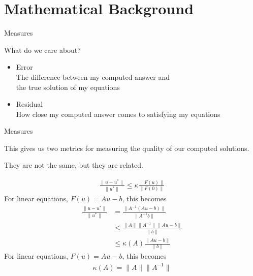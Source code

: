 \documentclass[dvipsnames]{beamer}
\begin{document}
\section{Mathematical Background}
\begin{frame}{Measures}\Large

\begin{center}\LARGE What do we care about?\end{center}

\bigskip

\begin{itemize}
  \item<2-> Error\\
    The difference between my computed answer and\\
    the true solution of my equations %

  \bigskip

  \item<3-> Residual\\
    How close my computed answer comes to satisfying my equations
\end{itemize}
\end{frame}
%
\begin{frame}{Measures}\Large
\begin{center}\LARGE This gives us two metrics for measuring the quality of our computed solutions.\end{center}

\bigskip

\begin{overprint}
\begin{center}They are not the same, but they are related.\end{center}
\begin{align*}
  \frac{\|u - u^*\|}{\|u^*\|} \le \kappa \frac{\|F(u)\|}{\|F(0)\|}
\end{align*}
For linear equations, $F(u) = A u - b$, this becomes
\begin{align*}
  \frac{\|u - u^*\|}{\|u^*\|} &= \frac{\|A^{-1} (Au - b)\|}{\|A^{-1} b\|}\\
                              &\le \frac{\|A\| \|A^{-1}\| \|Au - b\|}{\|b\|}\\
                              &\le \kappa(A) \frac{\|Au - b\|}{\|b\|}
\end{align*}
For linear equations, $F(u) = A u - b$, this becomes
\begin{align*}
  \kappa(A) = \|A\| \|A^{-1}\|
\end{align*}
\end{overprint}
\end{frame}
%
%
\end{document}
